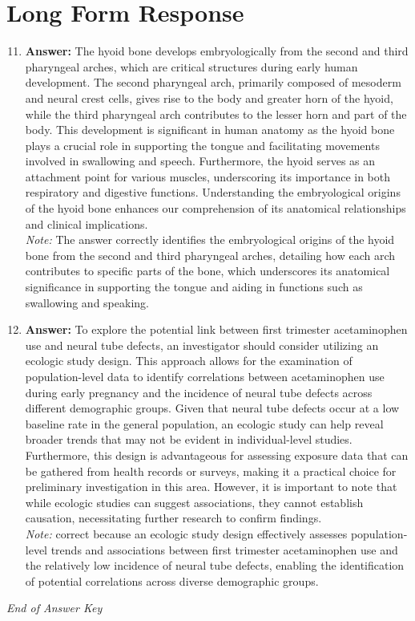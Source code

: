 \documentclass[12pt]{article}
\begin{document}
\section*{Long Form Response}
\begin{enumerate}[label=\arabic*.]
\setcounter{enumi}{10}
\item \textbf{Answer:} The hyoid bone develops embryologically from the second and third pharyngeal arches, which are critical structures during early human development. The second pharyngeal arch, primarily composed of mesoderm and neural crest cells, gives rise to the body and greater horn of the hyoid, while the third pharyngeal arch contributes to the lesser horn and part of the body. This development is significant in human anatomy as the hyoid bone plays a crucial role in supporting the tongue and facilitating movements involved in swallowing and speech. Furthermore, the hyoid serves as an attachment point for various muscles, underscoring its importance in both respiratory and digestive functions. Understanding the embryological origins of the hyoid bone enhances our comprehension of its anatomical relationships and clinical implications.
\\ \textit{Note:} The answer correctly identifies the embryological origins of the hyoid bone from the second and third pharyngeal arches, detailing how each arch contributes to specific parts of the bone, which underscores its anatomical significance in supporting the tongue and aiding in functions such as swallowing and speaking.
\item \textbf{Answer:} To explore the potential link between first trimester acetaminophen use and neural tube defects, an investigator should consider utilizing an ecologic study design. This approach allows for the examination of population-level data to identify correlations between acetaminophen use during early pregnancy and the incidence of neural tube defects across different demographic groups. Given that neural tube defects occur at a low baseline rate in the general population, an ecologic study can help reveal broader trends that may not be evident in individual-level studies. Furthermore, this design is advantageous for assessing exposure data that can be gathered from health records or surveys, making it a practical choice for preliminary investigation in this area. However, it is important to note that while ecologic studies can suggest associations, they cannot establish causation, necessitating further research to confirm findings.
\\ \textit{Note:} correct because an ecologic study design effectively assesses population-level trends and associations between first trimester acetaminophen use and the relatively low incidence of neural tube defects, enabling the identification of potential correlations across diverse demographic groups.
\end{enumerate}

\vfill
\noindent\textit{End of Answer Key}
\end{document}
